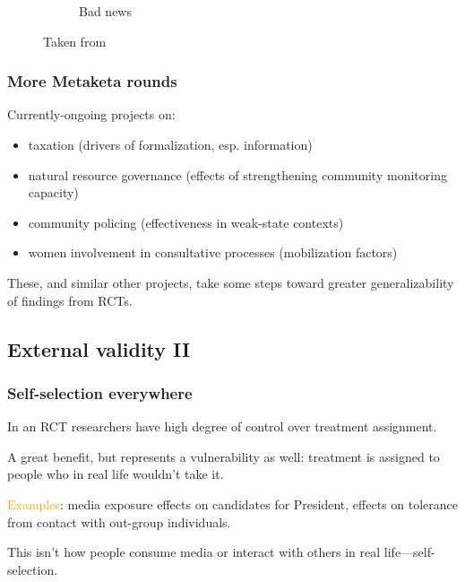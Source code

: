 \documentclass[12pt,english,dvipsnames,aspectratio=169,handout]{beamer}\usepackage[]{graphicx}\usepackage[]{xcolor}
\begin{document}
\begin{frame}
\begin{figure}
\begin{subfigure}{0.47\linewidth}
			\caption{Bad news}
		\end{subfigure}
		\caption{Taken from }
	\end{figure}
	
\end{frame}

\begin{frame}
	\frametitle{More Metaketa rounds}
	Currently-ongoing projects on:
	
	\begin{itemize}
		\item taxation (drivers of formalization, esp. information)
		\item natural resource governance (effects of strengthening community monitoring capacity)
		\item community policing (effectiveness in weak-state contexts)
		\item women involvement in consultative processes (mobilization factors)
	\end{itemize}
	\pause
	
	These, and similar other projects, take some steps toward greater generalizability of findings from RCTs.
	
\end{frame}


\subsection{External validity II}

\begin{frame}
	\frametitle{Self-selection everywhere}
	In an RCT researchers have high degree of control over treatment assignment.\bigskip
	
	A great benefit, but represents a vulnerability as well: treatment is assigned to people who in real life wouldn't take it.\bigskip
	\pause
	
	\textcolor{orange}{Examples}: media exposure effects on candidates for President, effects on tolerance from contact with out-group individuals.\bigskip
	\pause
	
	This isn't how people consume media or interact with others in real life---self-selection.
	
\end{frame}
\end{document}
